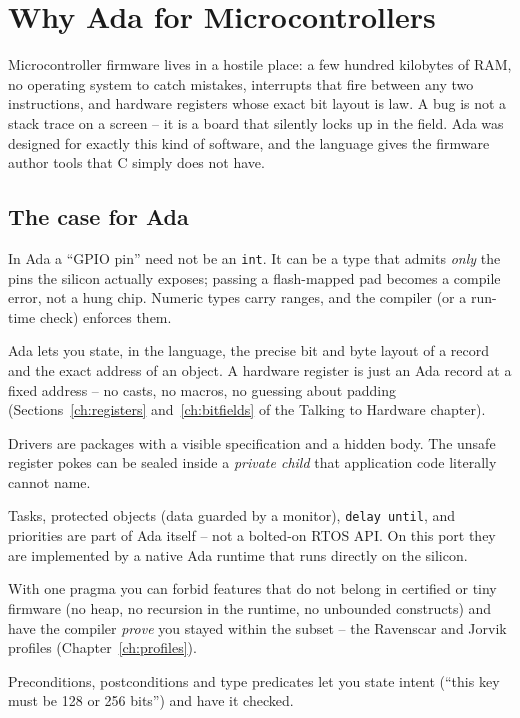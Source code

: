 \chapter{Why Ada for Microcontrollers}

Microcontroller firmware lives in a hostile place: a few hundred kilobytes of
RAM, no operating system to catch mistakes, interrupts that fire between any two
instructions, and hardware registers whose exact bit layout is law. A bug is not
a stack trace on a screen -- it is a board that silently locks up in the field.
Ada was designed for exactly this kind of software, and the language gives the
firmware author tools that C simply does not have.

\section{The case for Ada}

\begin{description}[style=nextline]
\item[Strong, range-checked types.] In Ada a ``GPIO pin'' need not be an
  \texttt{int}. It can be a type that admits \emph{only} the pins the silicon
  actually exposes; passing a flash-mapped pad becomes a compile error, not a
  hung chip. Numeric types carry ranges, and the compiler (or a run-time check)
  enforces them.
\item[Representation control.] Ada lets you state, in the language, the precise
  bit and byte layout of a record and the exact address of an object. A hardware
  register is just an Ada record at a fixed address -- no casts, no macros, no
  guessing about padding (Sections~\ref{ch:registers} and~\ref{ch:bitfields} of
  the Talking to Hardware chapter).
\item[Packages and strong interfaces.] Drivers are packages with a visible
  specification and a hidden body. The unsafe register pokes can be sealed inside
  a \emph{private child} that application code literally cannot name.
\item[Tasking and real-time in the language.] Tasks, protected objects (data
  guarded by a monitor), \texttt{delay until}, and priorities are part of Ada
  itself -- not a bolted-on RTOS API. On this port they are implemented by a
  native Ada runtime that runs directly on the silicon.
\item[Restriction profiles.] With one pragma you can forbid features that do not
  belong in certified or tiny firmware (no heap, no recursion in the runtime, no
  unbounded constructs) and have the compiler \emph{prove} you stayed within the
  subset -- the Ravenscar and Jorvik profiles (Chapter~\ref{ch:profiles}).
\item[Contracts.] Preconditions, postconditions and type predicates let you
  state intent (``this key must be 128 or 256 bits'') and have it checked.
\end{description}

